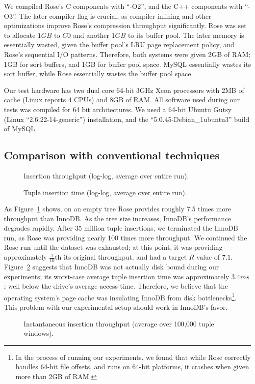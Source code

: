 \documentclass{vldb}
\newcommand{\rows}{Rose\xspace}
\newcommand{\rowss}{Rose's\xspace}
\begin{document}
We compiled \rowss C components with ``-O2'', and the C++ components
with ``-O3''.  The later compiler flag is crucial, as compiler
inlining and other optimizations improve \rowss compression throughput
significantly.  \rows was set to allocate $1GB$ to $C0$ and another
$1GB$ to its buffer pool.  The later memory is essentially wasted,
given the buffer pool's LRU page replacement policy, and \rowss
sequential I/O patterns.  Therefore, both systems were given 2GB of
RAM; 1GB for sort buffers, and 1GB for buffer pool space.  MySQL
essentially wastes its sort buffer, while \rows essentially wastes the
buffer pool space.

Our test hardware has two dual core 64-bit 3GHz Xeon processors with
2MB of cache (Linux reports 4 CPUs) and 8GB of RAM.  All software used during our tests
was compiled for 64 bit architectures.  We used a 64-bit Ubuntu Gutsy
(Linux ``2.6.22-14-generic'') installation, and the
``5.0.45-Debian\_1ubuntu3'' build of MySQL.

\subsection{Comparison with conventional techniques}

\begin{figure}
\centering {}
\caption{Insertion throughput (log-log, average over entire run).}
\label{fig:avg-thru}
\end{figure}
\begin{figure}
\centering
{}
\caption{Tuple insertion time (log-log, average over entire run).}
\label{fig:avg-tup}
\end{figure}

As Figure~\ref{fig:avg-thru} shows, on an empty tree \rows provides
roughly 7.5 times more throughput than InnoDB.  As the tree size
increases, InnoDB's performance degrades rapidly.  After 35 million
tuple insertions, we terminated the InnoDB run, as \rows was providing
nearly 100 times more throughput.  We continued the \rows run until
the dataset was exhausted; at this point, it was providing
approximately $\frac{1}{10}$th its original throughput, and had a
target $R$ value of $7.1$.  Figure~\ref{fig:avg-tup} suggests that
InnoDB was not actually disk bound during our experiments; its
worst-case average tuple insertion time was approximately $3.4 ms$;
well below the drive's average access time.  Therefore, we believe
that the operating system's page cache was insulating InnoDB from disk
bottlenecks\footnote{In the process of running our experiments, we
  found that while \rows correctly handles 64-bit file offsets, and
  runs on 64-bit platforms, it crashes when given more than 2GB of
  RAM.}.  This problem with our experimental setup should work in InnoDB's favor.
\begin{figure}
\centering
{}
\caption{Instantaneous insertion throughput (average over 100,000 tuple windows).}
\label{fig:inst-thru}
\end{figure}
\end{document}
